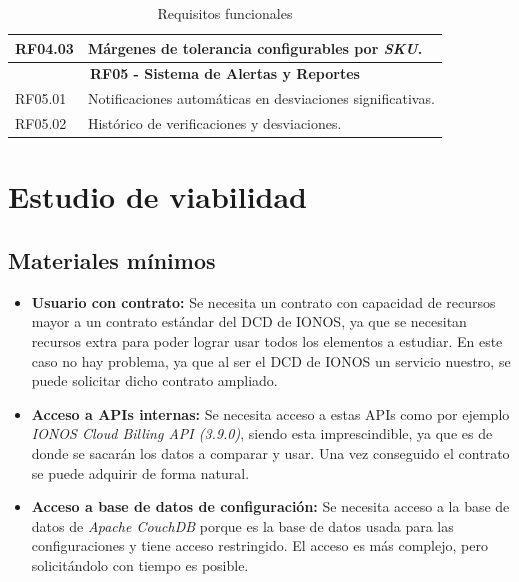 \begin{table}[htbp]
\begin{tabular}{|p{}|p{}|}
        \hline
        RF04.03    & Márgenes de tolerancia configurables por \textit{SKU}. \\
        \hline
        \multicolumn{2}{|c|}{\textbf{RF05 - Sistema de Alertas y Reportes}}                                                                                                                               \\
        \hline
        RF05.01    & Notificaciones automáticas en desviaciones significativas.                                                                                                                           \\
        \hline
        RF05.02    & Histórico de verificaciones y desviaciones.                                                                                                                                          \\
        \hline
    \end{tabular}
    \caption{Requisitos funcionales}
    \label{tab:requisitos-funcionales}
\end{table}

\clearpage

\section{Estudio de viabilidad}
\subsection{Materiales mínimos}
\begin{itemize}
    \item \textbf{Usuario con contrato: } Se necesita un contrato con capacidad de recursos mayor a un contrato estándar del DCD de IONOS, ya que se necesitan recursos extra para poder lograr usar todos los elementos a estudiar. En este caso no hay problema, ya que al ser el DCD de IONOS un servicio nuestro, se puede solicitar dicho contrato ampliado.
    \item \textbf{Acceso a APIs internas: }Se necesita acceso a estas APIs como por ejemplo \textit{IONOS Cloud Billing API (3.9.0)}, siendo esta imprescindible, ya que es de donde se sacarán los datos a comparar y usar. Una vez conseguido el contrato se puede adquirir de forma natural.
    \item \textbf{Acceso a base de datos de configuración: }Se necesita acceso a la base de datos de \textit{Apache CouchDB} porque es la base de datos usada para las configuraciones y tiene acceso restringido. El acceso es más complejo, pero solicitándolo con tiempo es posible.
\end{itemize}
